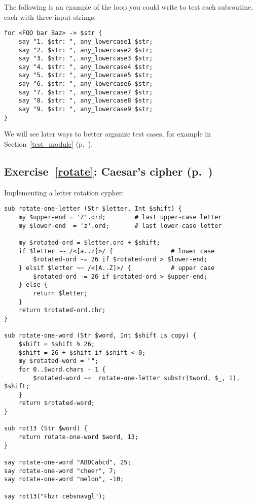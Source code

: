 The following is an example of the loop you could write to test 
each subroutine, each with three input strings:

\begin{verbatim}
for <FOO bar Baz> -> $str {
    say "1. $str: ", any_lowercase1 $str;
    say "2. $str: ", any_lowercase2 $str;
    say "3. $str: ", any_lowercase3 $str;
    say "4. $str: ", any_lowercase4 $str;
    say "5. $str: ", any_lowercase5 $str;
    say "6. $str: ", any_lowercase6 $str;
    say "7. $str: ", any_lowercase7 $str;
    say "8. $str: ", any_lowercase8 $str;
    say "9. $str: ", any_lowercase9 $str;
}
\end{verbatim}

We will see later ways to better organize test cases,  
for example in Section~\ref{test_module} (p.~\pageref{test_module}).

\subsection{Exercise~\ref{rotate}: Caesar's cipher (p.~\pageref{rotate})}
\label{sol_rotate}

Implementing a letter rotation cypher:

\begin{verbatim}
sub rotate-one-letter (Str $letter, Int $shift) {
    my $upper-end = 'Z'.ord;        # last upper-case letter
    my $lower-end  = 'z'.ord;       # last lower-case letter

    my $rotated-ord = $letter.ord + $shift;
    if $letter ~~ /<[a..z]>/ {                # lower case
        $rotated-ord -= 26 if $rotated-ord > $lower-end;
    } elsif $letter ~~ /<[A..Z]>/ {           # upper case
        $rotated-ord -= 26 if $rotated-ord > $upper-end;
    } else {
        return $letter;
    }
    return $rotated-ord.chr;
}

sub rotate-one-word (Str $word, Int $shift is copy) {
    $shift = $shift % 26;
    $shift = 26 + $shift if $shift < 0;
    my $rotated-word = "";
    for 0..$word.chars - 1 {
        $rotated-word ~=  rotate-one-letter substr($word, $_, 1), $shift;
    }
    return $rotated-word;
}

sub rot13 (Str $word) {
    return rotate-one-word $word, 13;
} 

say rotate-one-word "ABDCabcd", 25;
say rotate-one-word "cheer", 7;
say rotate-one-word "melon", -10;

say rot13("Fbzr cebsnavgl");
\end{verbatim}

